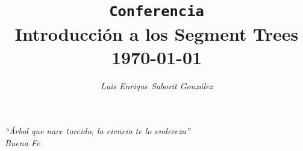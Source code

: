 \documentclass[a4paper, 10pt]{article}
\title{\vspace{30ex}\Large{ \texttt{Conferencia} \\ \textbf{Introducci\'on a los Segment Trees} \\ \today}}
\author{\textit{Luis Enrique Saborit Gonz\'alez}}
\date{}
\numberwithin{theoremCounter}{subsection}
\numberwithin{problemCounter}{subsection}
\numberwithin{defCounter}{subsection}
\numberwithin{obsCounter}{subsection}
\numberwithin{methCounter}{subsection}
\numberwithin{exampleCounter}{subsection}
\numberwithin{propCounter}{subsection}
\theoremstyle{violetnumbox}
\theoremstyle{blacknumex}
\begin{document}


\maketitle

\vspace*{\fill}


\begin{flushright}
    \textit{
        ``\'Arbol que nace torcido, la ciencia te lo endereza''\\
        Buena Fe    
    }

\vspace{3cm}

\end{flushright}

\newpage

\begin{multicols}{2}



\tableofcontents
\newpage
\pagestyle{fancy}



\end{multicols}
\end{document}
